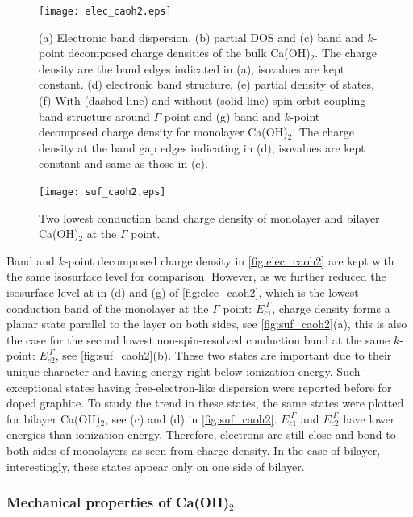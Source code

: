 \begin{figure}
\centering
\texttt{[image: elec\_caoh2.eps]}
\caption{\label{fig:elec_caoh2} (a) Electronic band dispersion, 
(b) partial DOS and (c) band and $k$-point decomposed charge densities of the bulk Ca(OH)$_2$. The charge density are the band 
edges indicated in (a), isovalues are kept constant. (d) electronic band structure, (e) partial
density of states, (f) With (dashed line) and without
(solid line) spin orbit coupling band structure around $\Gamma$ point and (g) band and $k$-point decomposed charge density for monolayer Ca(OH)$_2$.  The charge density at the 
band gap edges indicating in (d), isovalues are kept constant and same as those 
in (c).}
\end{figure}




\begin{figure}
\centering
\texttt{[image: suf\_caoh2.eps]}
\caption{\label{fig:suf_caoh2} Two lowest conduction band charge density of 
monolayer and bilayer Ca(OH)$_2$ at the $\Gamma$ point.}
\end{figure}

Band and $k$-point decomposed charge density in \autoref{fig:elec_caoh2} are 
kept with the same isosurface level for comparison. However, as we further 
reduced the isosurface level at  in (d) and (g) of \autoref{fig:elec_caoh2}, which is the lowest conduction band of the 
monolayer at the $\Gamma$ point: $E_{c1}^{~\Gamma}$, charge density forms a planar 
state parallel to the layer on both sides, see \autoref{fig:suf_caoh2}(a), this
is also the case for the second lowest non-spin-resolved conduction band at the same
$k$-point: $E_{c2}^{~\Gamma}$, see \autoref{fig:suf_caoh2}(b). These two states are 
important due to their unique character and having energy right below ionization energy. Such exceptional states 
having free-electron-like dispersion were reported before\cite{Posternak} for 
doped graphite. To study the trend in these states, the same states were plotted 
for bilayer Ca(OH)$_2$, see (c) and (d) in \autoref{fig:suf_caoh2}. $E_{c1}^{~\Gamma}$ and $E_{c2}^{~\Gamma}$ have lower energies than ionization energy. Therefore, electrons are still close and bond to both sides of monolayers as seen from charge density. In the case of bilayer, interestingly, these states appear only on one side of bilayer.





\subsubsection{Mechanical properties of C\lowercase{a}(OH)$_{2}$}\label{mechanical}

